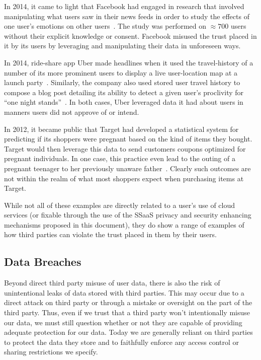 \begin{packed_desc}
\item[Facebook Emotional Contagion Study:] In 2014, it came to light
  that Facebook had engaged in research that involved manipulating
  what users saw in their news feeds in order to study the effects of
  one user's emotions on other users~\cite{goel2014}. The study was
  performed on $\approx700$ users without their explicit knowledge or
  consent. Facebook misused the trust placed in it by its users by
  leveraging and manipulating their data in unforeseen ways.
\item[Uber User Travel History:] In 2014, ride-share app Uber made
  headlines when it used the travel-history of a number of its more
  prominent users to display a live user-location map at a launch
  party~\cite{sims2014}. Similarly, the company also used stored user
  travel history to compose a blog post detailing its ability to
  detect a given user's proclivity for ``one night
  stands''~\cite{pagliery2014}. In both cases, Uber leveraged data it
  had about users in manners users did not approve of or intend.
\item[Target Pregnancy Prediction:] In 2012, it became public that
  Target had developed a statistical system for predicting if its
  shoppers were pregnant based on the kind of items they
  bought. Target would then leverage this data to send customers
  coupons optimized for pregnant individuals. In one case, this
  practice even lead to the outing of a pregnant teenager to her
  previously unaware father~\cite{hill2012}. Clearly such outcomes are
  not within the realm of what most shoppers expect when purchasing
  items at Target.
\end{packed_desc}

While not all of these examples are directly related to a user's use
of cloud services (or fixable through the use of the SSaaS privacy and
security enhancing mechanisms proposed in this document), they do show
a range of examples of how third parties can violate the trust placed
in them by their users.

\subsection{Data Breaches}

Beyond direct third party misuse of user data, there is also the risk
of unintentional leaks of data stored with third parties. This may
occur due to a direct attack on third party or through a mistake or
oversight on the part of the third party. Thus, even if we trust that
a third party won't intentionally misuse our data, we must still
question whether or not they are capable of providing adequate
protection for our data. Today we are generally reliant on third
parties to protect the data they store and to faithfully enforce any
access control or sharing restrictions we specify.

